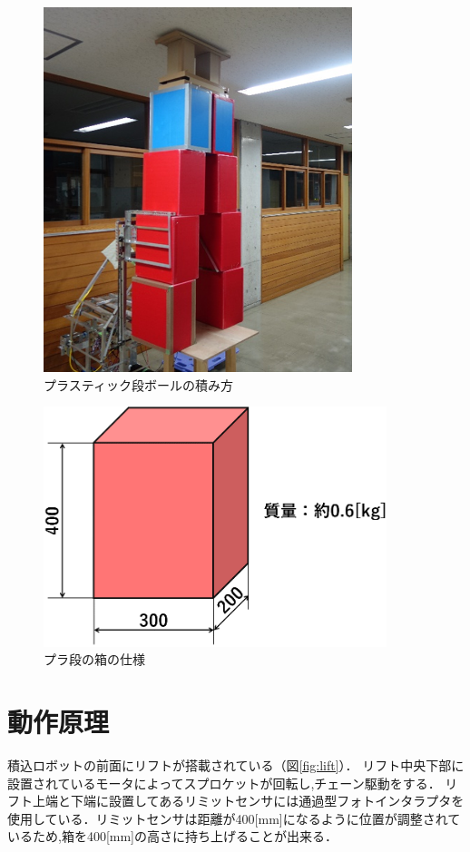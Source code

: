 \begin{figure}[htbp]
  \begin{center}
    \includegraphics[width=90mm]{img/tumikata.png}
    \end{center}
  \caption{プラスティック段ボールの積み方}
 \label{fig:tumikata}
\end{figure}

\begin{figure}[htbp]
  \begin{center}
    \includegraphics[width=100mm]{img/plabox.png}
    \end{center}
  \caption{プラ段の箱の仕様}
 \label{fig:plabox}
\end{figure}




\section{動作原理}
積込ロボットの前面にリフトが搭載されている（図\ref{fig:lift}）．
リフト中央下部に設置されているモータによってスプロケットが回転し,チェーン駆動をする．
リフト上端と下端に設置してあるリミットセンサには通過型フォトインタラプタを使用している．リミットセンサは距離が400[mm]になるように位置が調整されているため,箱を400[mm]の高さに持ち上げることが出来る．



